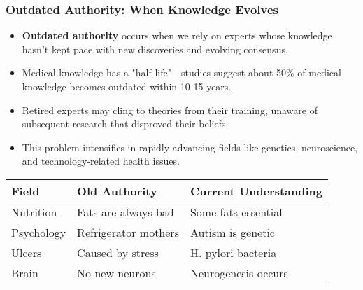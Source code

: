 \documentclass{beamer}
\begin{document}
	\begin{frame}
		\frametitle{Outdated Authority: When Knowledge Evolves}
		\begin{itemize}
			\item \textbf{Outdated authority} occurs when we rely on experts whose knowledge hasn't kept pace with new discoveries and evolving consensus.
			\item Medical knowledge has a "half-life"—studies suggest about 50\% of medical knowledge becomes outdated within 10-15 years.
			\item Retired experts may cling to theories from their training, unaware of subsequent research that disproved their beliefs.
			\item This problem intensifies in rapidly advancing fields like genetics, neuroscience, and technology-related health issues.
		\end{itemize}
		
		\begin{table}
			\centering
			\begin{tabular}{|l|l|l|}
				\hline
				\textbf{Field} & \textbf{Old Authority} & \textbf{Current Understanding} \\
				\hline
				Nutrition & Fats are always bad & Some fats essential \\
				Psychology & Refrigerator mothers & Autism is genetic \\
				Ulcers & Caused by stress & H. pylori bacteria \\
				Brain & No new neurons & Neurogenesis occurs \\
				\hline
			\end{tabular}
		\end{table}
	\end{frame}
	
\end{document}
